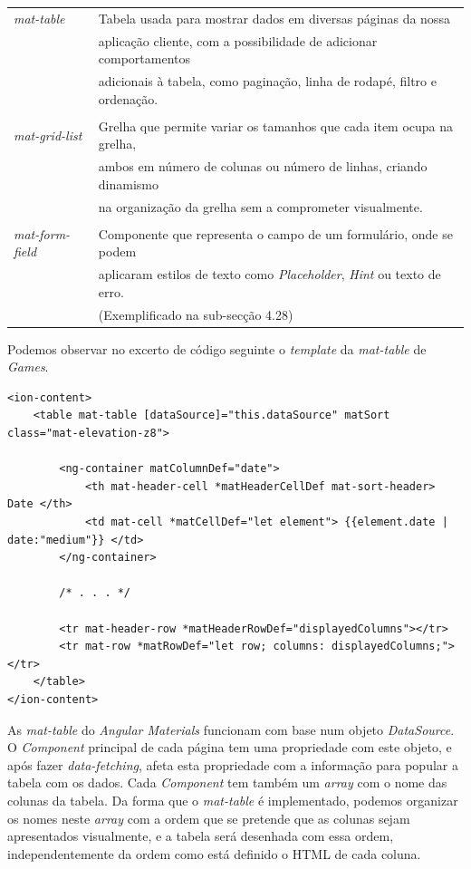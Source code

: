 \begin{tabular}{ll}
	\textit{mat-table} & Tabela usada para mostrar dados em diversas páginas da nossa \\
	&aplicação cliente, com a possibilidade de 
	adicionar comportamentos \\
	&adicionais à tabela, como paginação, linha de rodapé, filtro e ordenação. \\
	& \\
	\textit{mat-grid-list} & Grelha que permite variar os tamanhos que cada item ocupa na grelha,\\
	& ambos em número de colunas ou número de linhas, criando dinamismo \\
	&na organização da grelha sem a comprometer visualmente.\\
	& \\
	\textit{mat-form-field} & Componente que representa o campo de um formulário, onde se podem \\
	&aplicaram estilos de texto como \textit{Placeholder}, \textit{Hint} ou texto de erro. \\
	&(Exemplificado na sub-secção 4.28)\\
\end{tabular}

Podemos observar no excerto de código seguinte o \textit{template} da \textit{mat-table} de \textit{Games}.

\begin{lstlisting}
<ion-content>
	<table mat-table [dataSource]="this.dataSource" matSort class="mat-elevation-z8">
	
		<ng-container matColumnDef="date">
			<th mat-header-cell *matHeaderCellDef mat-sort-header> Date </th>
			<td mat-cell *matCellDef="let element"> {{element.date | date:"medium"}} </td>
		</ng-container>
		
		/* . . . */
		
		<tr mat-header-row *matHeaderRowDef="displayedColumns"></tr>
		<tr mat-row *matRowDef="let row; columns: displayedColumns;"></tr>
	</table>
</ion-content>
\end{lstlisting}
As \textit{mat-table} do \textit{Angular Materials} funcionam com base num objeto \textit{DataSource}. O \textit{Component} principal de cada página tem uma propriedade com este objeto, e após fazer \textit{data-fetching}, afeta esta propriedade com a informação para popular a tabela com os dados. Cada \textit{Component} tem também um \textit{array} com o nome das colunas da tabela. Da forma que o \textit{mat-table} é implementado, podemos organizar os nomes neste \textit{array} com a ordem que se pretende que as colunas sejam apresentados visualmente, e a tabela será desenhada com essa ordem, independentemente da ordem como está definido o HTML de cada coluna. \\


